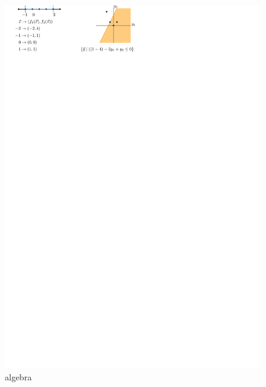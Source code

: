 \documentclass[a4paper, UKenglish]{paper}
\begin{document}
\begin{figure}[h]
    \centering
    \includegraphics{../algebraic}
    \caption{algebra}
    \label{fig:algebraic}
\end{figure}
\end{document}
